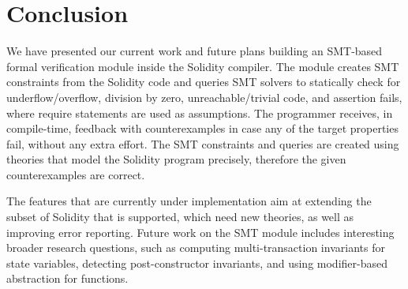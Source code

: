 \section{Conclusion}
\label{section:conclusion}
We have presented our current work and future plans building an SMT-based
formal verification module inside the Solidity compiler.
%
The module creates SMT constraints from the Solidity code and queries SMT
solvers to statically check for underflow/overflow, division by zero,
unreachable/trivial code, and assertion fails, where require statements are
used as assumptions.
%
The programmer receives, in compile-time, feedback with counterexamples in case
any of the target properties fail, without any extra effort.
%
The SMT constraints and queries are created using theories that model the
Solidity program precisely, therefore the given counterexamples are correct.

The features that are currently under implementation aim at extending the
subset of Solidity that is supported, which need new theories, as well as
improving error reporting.
%
Future work on the SMT module includes interesting broader research questions,
such as computing multi-transaction invariants for state variables, detecting
post-constructor invariants, and using modifier-based abstraction for
functions.
